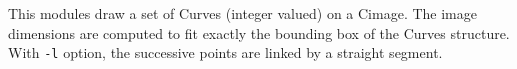 This modules draw a set of Curves (integer valued) on a Cimage.
The image dimensions are computed to fit exactly the bounding box
of the Curves structure.
With \verb+-l+ option, the successive points are linked by a straight 
segment.
